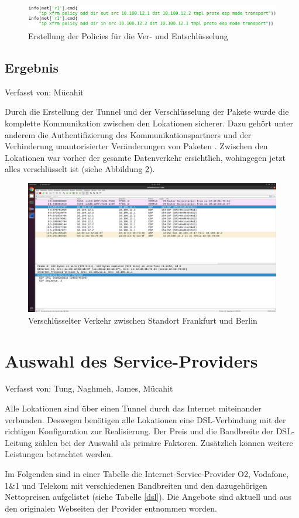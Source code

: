 \documentclass[fontsize=12pt,paper=a4,open=any,parskip=half,
  twoside=false,toc=listof,toc=bibliography,fleqn,leqno,
  captions=nooneline,captions=tableabove,british]{scrbook}
\begin{document}
\begin{figure}[H]
 \centering
 \includegraphics[width=1.0\textwidth]{Bilder/policy}
 \captionsetup{justification=centering}
 \caption{Erstellung der Policies für die Ver- und Entschlüsselung}
 \label{policy}
\end{figure}

\subsection{Ergebnis}
{\tiny Verfasst von: Mücahit\par}
Durch die Erstellung der Tunnel und der Verschlüsselung der Pakete wurde die komplette Kommunikation zwischen den Lokationen sicherer. Dazu gehört unter anderem die Authentifizierung des Kommunikationspartners und der Verhinderung unautorisierter Veränderungen von Paketen \cite{espsecurity}. Zwischen den Lokationen war vorher der gesamte Datenverkehr ersichtlich, wohingegen jetzt alles verschlüsselt ist (siehe Abbildung \ref{esp}).

\begin{figure}[H]
 \centering
 \includegraphics[width=1.0\textwidth]{Bilder/esp}
 \captionsetup{justification=centering}
 \caption{Verschlüsselter Verkehr zwischen Standort Frankfurt und Berlin}
 \label{esp}
\end{figure}


\section{Auswahl des Service-Providers}
{\tiny Verfasst von: Tung, Naghmeh, James, Mücahit\par}
Alle Lokationen sind über einen Tunnel durch das Internet miteinander verbunden. Deswegen benötigen alle Lokationen eine DSL-Verbindung mit der richtigen Konfiguration zur Realisierung. Der Preis und die Bandbreite der DSL-Leitung zählen bei der Auswahl als primäre Faktoren. Zusätzlich können weitere Leistungen betrachtet werden.\par 
Im Folgenden sind in einer Tabelle die Internet-Service-Provider O2, Vodafone, 1\&1 und Telekom mit verschiedenen Bandbreiten und den dazugehörigen Nettopreisen aufgelistet \cite{o2} \cite{vodafone} \cite{1u1} \cite{telekom} (siehe Tabelle \ref{dsl}). Die Angebote sind aktuell und aus den originalen Webseiten der Provider entnommen worden.
\end{document}
